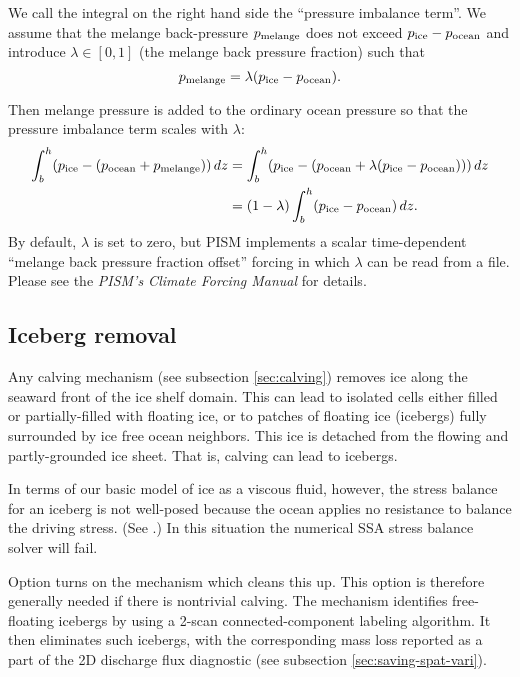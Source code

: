 We call the integral on the right hand side the ``pressure imbalance term''. We assume that the melange back-pressure $p_{\text{melange}}$ does not exceed $p_{\text{ice}} - p_{\text{ocean}}$ and introduce $\lambda \in [0,1]$ (the melange back pressure fraction) such that
\begin{equation*}
  p_{\text{melange}} = \lambda (p_{\text{ice}} - p_{\text{ocean}}).
\end{equation*}

Then melange pressure is added to the ordinary ocean pressure so that the pressure imbalance term scales with $\lambda$:
\begin{align}
\int_{b}^{h}(p_{\text{ice}} - (p_{\text{ocean}} + p_{\text{melange}}))\, dz &= \int_{b}^{h}(p_{\text{ice}} - (p_{\text{ocean}} + \lambda(p_{\text{ice}} - p_{\text{ocean}})))\, dz \notag \\
&= (1 - \lambda) \int_{b}^{h} (p_{\text{ice}} - p_{\text{ocean}})\, dz.  \label{eq:cfbc-3}
\end{align}
By default, $\lambda$ is set to zero, but PISM implements a scalar time-dependent ``melange back pressure fraction offset'' forcing in which $\lambda$ can be read from a file.  Please see the \emph{PISM's Climate Forcing Manual} for details.

\subsection{Iceberg removal}
\label{sec:kill-icebergs}

Any calving mechanism (see subsection \ref{sec:calving}) removes ice along the seaward front of the ice shelf domain.  This can lead to isolated cells either filled or partially-filled with floating ice, or to patches of floating ice (icebergs) fully surrounded by ice free ocean neighbors.  This ice is detached from the flowing and partly-grounded ice sheet.  That is, calving can lead to icebergs.

In terms of our basic model of ice as a viscous fluid, however, the stress balance for an iceberg is not well-posed because the ocean applies no resistance to balance the driving stress.  (See \cite{SchoofStream}.)  In this situation the numerical SSA stress balance solver will fail.

Option  turns on the mechanism which cleans this up.  This option is therefore generally needed if there is nontrivial calving.  The mechanism identifies free-floating icebergs by using a 2-scan connected-component labeling algorithm.  It then eliminates such icebergs, with the corresponding mass loss reported as a part of the 2D discharge flux diagnostic (see subsection \ref{sec:saving-spat-vari}).

